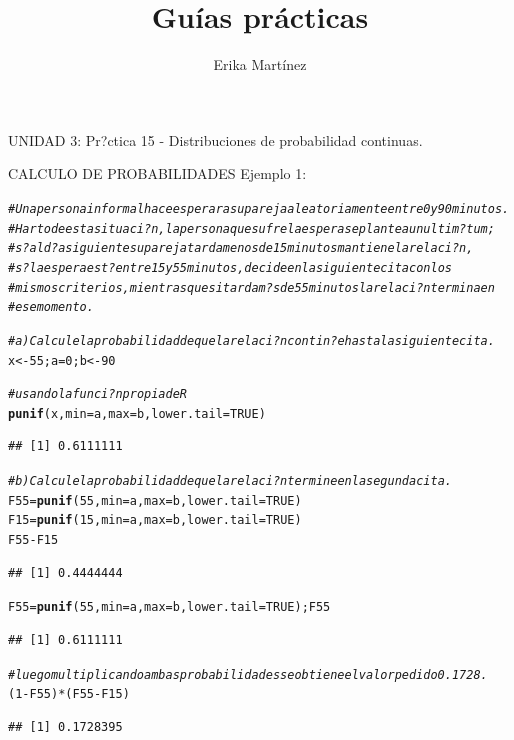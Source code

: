 \documentclass[10pt,a4paper]{article}\usepackage[]{graphicx}\usepackage[]{color}
\author{Erika Martínez}
\title{Guías prácticas}
\makeatletter
\newcommand{\hlnum}[1]{\textcolor[rgb]{0.686,0.059,0.569}{#1}}%
\newcommand{\hlcom}[1]{\textcolor[rgb]{0.678,0.584,0.686}{\textit{#1}}}%
\newcommand{\hlopt}[1]{\textcolor[rgb]{0,0,0}{#1}}%
\newcommand{\hlstd}[1]{\textcolor[rgb]{0.345,0.345,0.345}{#1}}%
\newcommand{\hlkwb}[1]{\textcolor[rgb]{0.69,0.353,0.396}{#1}}%
\newcommand{\hlkwc}[1]{\textcolor[rgb]{0.333,0.667,0.333}{#1}}%
\newcommand{\hlkwd}[1]{\textcolor[rgb]{0.737,0.353,0.396}{\textbf{#1}}}%
\newenvironment{kframe}{%
 \def\at@end@of@kframe{}%
 \ifinner\ifhmode%
  \def\at@end@of@kframe{\end{minipage}}%
  \begin{minipage}{\columnwidth}%
 \fi\fi%
 \def\FrameCommand##1{\hskip\@totalleftmargin \hskip-\fboxsep
 \colorbox{shadecolor}{##1}\hskip-\fboxsep
     \hskip-\linewidth \hskip-\@totalleftmargin \hskip\columnwidth}%
 \MakeFramed {\advance\hsize-\width
   \@totalleftmargin\z@ \linewidth\hsize
   \@setminipage}}%
 {\par\unskip\endMakeFramed%
 \at@end@of@kframe}
\newenvironment{knitrout}{}{} %
\makeatother
\begin{document}
\maketitle
\newpage

UNIDAD 3: Pr?ctica 15 - Distribuciones de probabilidad continuas.

CALCULO DE PROBABILIDADES
Ejemplo 1: 
\begin{knitrout}
\color{fgcolor}\begin{kframe}
\begin{alltt}
\hlcom{#Una persona informal hace esperar a su pareja aleatoriamente entre 0 y 90 minutos. }
\hlcom{#Harto de esta situaci?n, la persona que sufre la espera se plantea un ultim?tum; }
\hlcom{#s? al d?a siguiente su pareja tarda menos de 15 minutos mantiene la relaci?n, }
\hlcom{#s? la espera est? entre 15 y 55 minutos, decide en la siguiente cita con los }
\hlcom{#mismos criterios, mientras que si tarda m?s de 55 minutos la relaci?n termina en }
\hlcom{#ese momento. }

\hlcom{#a) Calcule la probabilidad de que la relaci?n contin?e hastala siguiente cita. }
\hlstd{x} \hlkwb{<-} \hlnum{55}\hlstd{; a}\hlkwb{=}\hlnum{0}\hlstd{; b} \hlkwb{<-} \hlnum{90}

\hlcom{#usando la funci?n propia de R }
\hlkwd{punif}\hlstd{(x,} \hlkwc{min}\hlstd{=a,} \hlkwc{max}\hlstd{=b,} \hlkwc{lower.tail}\hlstd{=}\hlnum{TRUE}\hlstd{)}
\end{alltt}
\begin{verbatim}
## [1] 0.6111111
\end{verbatim}
\begin{alltt}
\hlcom{#b) Calcule la probabilidad de que la relaci?n termine en la segunda cita.}
\hlstd{F55}\hlkwb{=}\hlkwd{punif}\hlstd{(}\hlnum{55}\hlstd{,} \hlkwc{min}\hlstd{=a,} \hlkwc{max}\hlstd{=b,} \hlkwc{lower.tail}\hlstd{=}\hlnum{TRUE}\hlstd{)}
\hlstd{F15}\hlkwb{=}\hlkwd{punif}\hlstd{(}\hlnum{15}\hlstd{,} \hlkwc{min}\hlstd{=a,} \hlkwc{max}\hlstd{=b,} \hlkwc{lower.tail}\hlstd{=}\hlnum{TRUE}\hlstd{)}
\hlstd{F55}\hlopt{-}\hlstd{F15}
\end{alltt}
\begin{verbatim}
## [1] 0.4444444
\end{verbatim}
\begin{alltt}
\hlstd{F55}\hlkwb{=}\hlkwd{punif}\hlstd{(}\hlnum{55}\hlstd{,} \hlkwc{min}\hlstd{=a,} \hlkwc{max}\hlstd{=b,} \hlkwc{lower.tail}\hlstd{=}\hlnum{TRUE}\hlstd{);F55}
\end{alltt}
\begin{verbatim}
## [1] 0.6111111
\end{verbatim}
\begin{alltt}
\hlcom{#luego multiplicando ambas probabilidades se obtiene el valor pedido 0.1728. }
\hlstd{(}\hlnum{1}\hlopt{-}\hlstd{F55)}\hlopt{*}\hlstd{( F55}\hlopt{-}\hlstd{F15)}
\end{alltt}
\begin{verbatim}
## [1] 0.1728395
\end{verbatim}
\end{kframe}
\end{knitrout}
\end{document}
